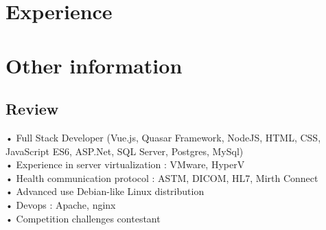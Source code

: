 \documentclass[letterpaper]{twentysecondcveng} %
\begin{document}
\section{Experience}

\begin{twenty} %
\end{twenty}


\section{Other information}

\subsection{Review}

• Full Stack Developer (Vue.js, Quasar Framework, NodeJS, HTML, CSS, JavaScript ES6, ASP.Net, SQL Server, Postgres, MySql)\\ 
• Experience in server virtualization : VMware, HyperV \\
• Health communication protocol : ASTM, DICOM, HL7, Mirth Connect\\
• Advanced use Debian-like Linux distribution \\
• Devops : Apache, nginx\\
• Competition challenges contestant




\end{document}
